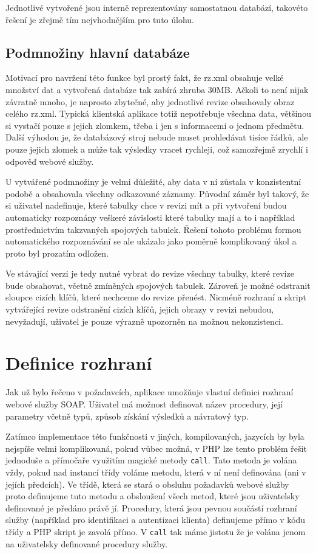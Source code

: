 \documentclass[11pt,twoside,a4paper]{book}
\begin{document}
Jednotlivé vytvořené jsou interně reprezentovány samostatnou databází, takovéto řešení je zřejmě tím nejvhodnějším pro tuto úlohu.

\subsection{Podmnožiny hlavní databáze}

Motivací pro navržení této funkce byl prostý fakt, že rz.xml obsahuje velké množství dat a vytvořená databáze tak zabírá zhruba 30MB. Ačkoli to není nijak závratně mnoho, je naprosto zbytečné, aby jednotlivé revize obsahovaly obraz celého rz.xml. Typická klientská aplikace totiž nepotřebuje všechna data, většinou si vystačí pouze s jejich zlomkem, třeba i jen s informacemi o jednom předmětu. Další výhodou je, že databázový stroj nebude muset prohledávat tisíce řádků, ale pouze jejich zlomek a může tak výsledky vracet rychleji, což samozřejmě zrychlí i odpověď webové služby.

U vytvářené podmnožiny je velmi důležité, aby data v ní zůstala v konzistentní podobě a obsahovala všechny odkazované záznamy. Původní záměr byl takový, že si uživatel nadefinuje, které tabulky chce v revizi mít a při vytvoření budou automaticky rozpoznány veškeré závislosti které tabulky mají a to i například prostřednictvím takzvaných spojových tabulek. Řešení tohoto problému formou automatického rozpoznávání se ale ukázalo jako poměrně komplikovaný úkol a proto byl prozatím odložen.

Ve stávající verzi je tedy nutné vybrat do revize všechny tabulky, které revize bude obsahovat, včetně zmíněných spojových tabulek. Zároveň je možné odstranit sloupce cizích klíčů, které nechceme do revize přenést. Nicméně rozhraní a skript vytvářející revize odstranění cizích klíčů, jejich obrazy v revizi nebudou, nevyžadují, uživatel je pouze výrazně upozorněn na možnou nekonzistenci.

\section{Definice rozhraní}

Jak už bylo řečeno v požadavcích, aplikace umožňuje vlastní definici rozhraní webové služby SOAP. Uživatel má možnost definovat název procedury, její parametry včetně typů, způsob získání výsledků a návratový typ.

Zatímco implementace této funkčnosti v jiných, kompilovaných, jazycích by byla nejspíše velmi komplikovaná, pokud vůbec možná, v PHP lze tento problém řešit jednoduše a přímočaře využitím magické metody \texttt{call}. Tato metoda je volána vždy, pokud nad instancí třídy voláme metodu, která v ní není definována (ani v jejích předcích). Ve třídě, která se stará o obsluhu požadavků webové služby proto definujeme tuto metodu a obsloužení všech metod, které jsou uživatelsky definované je předáno právě jí. Procedury, která jsou pevnou součástí rozhraní služby (například pro identifikaci a autentizaci klienta) definujeme přímo v kódu třídy a PHP skript je zavolá přímo. V \texttt{call} tak máme jistotu že je volána jenom na uživatelsky definované procedury služby.
\end{document}
